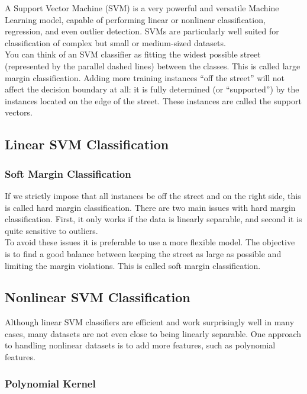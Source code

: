 \documentclass[french]{article}
\begin{document}
A Support Vector Machine (SVM) is a very powerful and versatile Machine Learning model, capable of performing linear or nonlinear classification, regression, and even outlier detection. SVMs are particularly well suited for classification of complex but small or medium-sized datasets.\\

You can think of an SVM classifier as fitting the widest possible street (represented by the parallel dashed lines) between the classes.  This is called large margin classification. Adding more training instances “off the street” will not affect the decision boundary at all: it is fully determined (or “supported”) by the instances located on the edge of the street. These instances are called the support vectors.

\subsection{Linear SVM Classification}

\subsubsection{Soft Margin Classification}

If we strictly impose that all instances be off the street and on the right side, this is called hard margin classification. There are two main issues with hard margin classification. First, it only works if the data is linearly separable, and second it is quite sensitive to outliers.\\

To avoid these issues it is preferable to use a more flexible model. The objective is to find a good balance between keeping the street as large as possible and limiting the margin violations. This is called soft margin classification.

\subsection{Nonlinear SVM Classification}

Although linear SVM classifiers are efficient and work surprisingly well in many cases, many datasets are not even close to being linearly separable. One approach to handling nonlinear datasets is to add more features, such as polynomial features.

\subsubsection{Polynomial Kernel}
\end{document}
